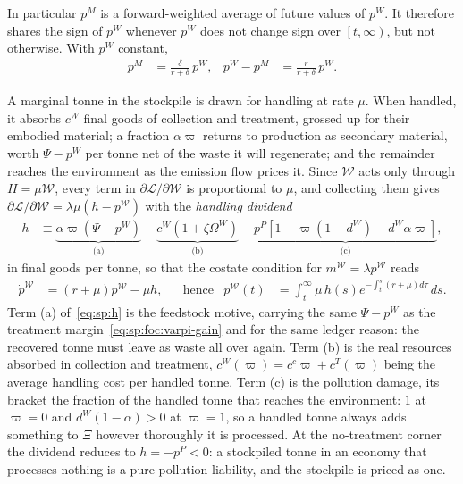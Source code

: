 In particular $p^M$ is a forward-weighted average of future values of $p^W$. It therefore shares the sign of $p^W$ whenever $p^W$ does not change sign over $\left[t,\infty\right)$, but not otherwise. With $p^W$ constant,
\begin{align}
p^M &= \frac{\delta}{r+\delta}\,p^W,
&
p^W-p^M &= \frac{r}{r+\delta}\,p^W .
\label{eq:sp:costate:M-steady}
\end{align}

 A marginal tonne in the stockpile is drawn for handling at rate $\mu$. When handled, it absorbs $c^W$ final goods of collection and treatment, grossed up for their embodied material; a fraction $\alpha\varpi$ returns to production as secondary material, worth $\Psi-p^W$ per tonne net of the waste it will regenerate; and the remainder reaches the environment as the emission flow prices it. Since $\mathcal W$ acts only through $H=\mu\mathcal W$, every term in $\partial\mathcal L/\partial\mathcal W$ is proportional to $\mu$, and collecting them gives $\partial\mathcal L/\partial\mathcal W=\lambda\mu\left(h-p^{\mathcal W}\right)$ with the \emph{handling dividend}
\begin{align}
h &\equiv
\underbrace{\alpha\varpi\left(\Psi-p^W\right)}_{\text{(a)}}
-\underbrace{c^W\left(1+\zeta\Omega^W\right)}_{\text{(b)}}
-\underbrace{p^P\left[1-\varpi\left(1-d^W\right)-d^W\alpha\varpi\right]}_{\text{(c)}} ,
\label{eq:sp:h}
\end{align}
in final goods per tonne, so that the costate condition for $m^{\mathcal W}=\lambda p^{\mathcal W}$ reads
\begin{align}
\dot p^{\mathcal W} &= \left(r+\mu\right)p^{\mathcal W}-\mu h,
&&\text{hence}
&
p^{\mathcal W}\left(t\right) &= \int_t^\infty \mu\,h\left(s\right)e^{-\int_t^s\left(r+\mu\right)d\tau}\,ds .
\label{eq:sp:costate:Wstock}
\end{align}
Term (a) of~\eqref{eq:sp:h} is the feedstock motive, carrying the same $\Psi-p^W$ as the treatment margin~\eqref{eq:sp:foc:varpi-gain} and for the same ledger reason: the recovered tonne must leave as waste all over again. Term (b) is the real resources absorbed in collection and treatment, $c^W\left(\varpi\right)=c^c\varpi+c^T\left(\varpi\right)$ being the average handling cost per handled tonne. Term (c) is the pollution damage, its bracket the fraction of the handled tonne that reaches the environment: $1$ at $\varpi=0$ and $d^W\left(1-\alpha\right)>0$ at $\varpi=1$, so a handled tonne always adds something to $\Xi$ however thoroughly it is processed. At the no-treatment corner the dividend reduces to $h=-p^P<0$: a stockpiled tonne in an economy that processes nothing is a pure pollution liability, and the stockpile is priced as one.

